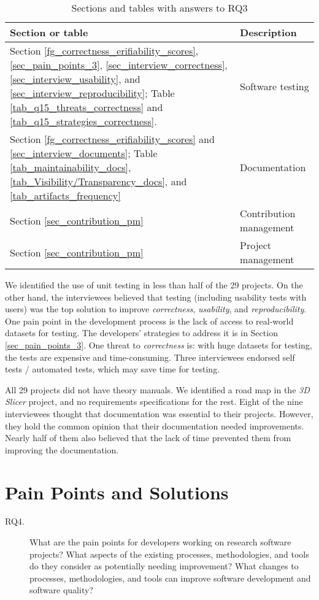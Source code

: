 \begin{table}[H]
\centering
\begin{tabular}{ll}
\hline
Section or table & Description \\ \hline
Section \ref{fg_correctness_erifiability_scores}, \ref{sec_pain_points_3}, \ref{sec_interview_correctness}, \ref{sec_interview_usability}, and \ref{sec_interview_reproducibility}; Table \ref{tab_q15_threats_correctness} and \ref{tab_q15_strategies_correctness}. & Software testing \\
Section \ref{fg_correctness_erifiability_scores} and \ref{sec_interview_documents}; Table \ref{tab_maintainability_docs}, \ref{tab_Visibility/Transparency_docs}, and \ref{tab_artifacts_frequency} & Documentation \\
Section \ref{sec_contribution_pm} & Contribution management \\
Section \ref{sec_contribution_pm} & Project management \\ \hline
\end{tabular}
\caption{\label{tab_reference_rq3}Sections and tables with answers to RQ3}
\end{table}

We identified the use of unit testing in less than half of the 29 projects. On the other hand, the interviewees believed that testing (including usability tests with users) was the top solution to improve \textit{correctness}, \textit{usability}, and \textit{reproducibility}. One pain point in the development process is the lack of access to real-world datasets for testing. The developers' strategies to address it is in Section \ref{sec_pain_points_3}. One threat to \textit{correctness} is: with huge datasets for testing, the tests are expensive and time-consuming. Three interviewees endorsed self tests / automated tests, which may save time for testing.

All 29 projects did not have theory manuals. We identified a road map in the \textit{3D Slicer} project, and no requirements specifications for the rest. Eight of the nine interviewees thought that documentation was essential to their projects. However, they hold the common opinion that their documentation needed improvements. Nearly half of them also believed that the lack of time prevented them from improving the documentation.

\section{Pain Points and Solutions}
\label{sec_rq_pain_points}
\begin{description}
\item[RQ4.] What are the pain points for developers working on research software projects? What aspects of the existing processes, methodologies, and tools do they consider as potentially needing improvement? What changes to processes, methodologies, and tools can improve software development and software quality?
\end{description}


